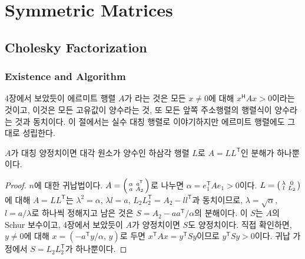 \chapter{Symmetric Matrices}
\label{ch:symmetric}


\section{Cholesky Factorization}
\label{sec:cholesky}

\subsection{Existence and Algorithm}

4장에서 보았듯이 에르미트 행렬 $A$가 라는 것은 모든 $x\ne0$에 대해 $x^{\mathsf H}Ax>0$이라는 것이고, 이것은 모든 고유값이 양수라는 것, 또 모든 앞쪽 주소행렬의 행렬식이 양수라는 것과 동치이다. 이 절에서는 실수 대칭 행렬로 이야기하지만 에르미트 행렬에도 그대로 성립한다.

\begin{theorem}
\label{thm:cholesky}
$A$가 대칭 양정치이면 대각 원소가 양수인 하삼각 행렬 $L$로 $A=LL^{\mathsf T}$인 분해가 하나뿐이다.
\end{theorem}

\begin{proof}
$n$에 대한 귀납법이다. $A=\begin{psmallmatrix}\alpha&a^{\mathsf T}\\a&A_2\end{psmallmatrix}$로 나누면 $\alpha=e_1^{\mathsf T}Ae_1>0$이다. $L=\begin{psmallmatrix}\lambda&0\\l&L_2\end{psmallmatrix}$에 대해 $A=LL^{\mathsf T}$는 $\lambda^2=\alpha$, $\lambda l=a$, $L_2L_2^{\mathsf T}=A_2-ll^{\mathsf T}$과 동치이므로, $\lambda=\sqrt\alpha$, $l=a/\lambda$로 하나씩 정해지고 남은 것은 $S=A_2-aa^{\mathsf T}/\alpha$의 분해이다. 이 $S$는 $A$의 Schur 보수이고, 4장에서 보았듯이 $A$가 양정치이면 $S$도 양정치이다. 직접 확인하면, $y\ne0$에 대해 $x=(-a^{\mathsf T}y/\alpha,\,y)$로 두면 $x^{\mathsf T}Ax=y^{\mathsf T}Sy$이므로 $y^{\mathsf T}Sy>0$이다. 귀납 가정에서 $S=L_2L_2^{\mathsf T}$가 하나뿐이다.
\end{proof}

